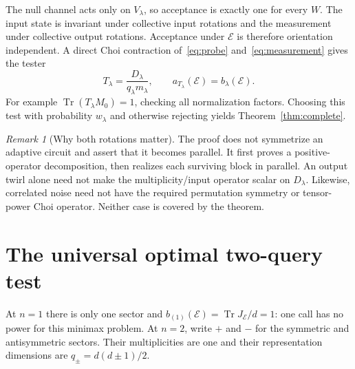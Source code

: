 \documentclass[11pt,a4paper]{article}
\theoremstyle{remark}\newtheorem{remark}[theorem]{Remark}
\DeclareMathOperator{\Tr}{Tr}
\newcommand{\cE}{\mathcal E}
\begin{document}
The null channel acts only on $V_\lambda$, so acceptance is exactly one for every $W$. The input state is invariant under collective input rotations and the measurement under collective output rotations. Acceptance under $\cE$ is therefore orientation independent. A direct Choi contraction of~\eqref{eq:probe} and~\eqref{eq:measurement} gives the tester
\begin{equation}\label{eq:Tlambda}
 T_\lambda=\frac{D_\lambda}{q_\lambda m_\lambda},
 \qquad a_{T_\lambda}(\cE)=b_\lambda(\cE).
\end{equation}
For example $\Tr(T_\lambda M_0)=1$, checking all normalization factors. Choosing this test with probability $w_\lambda$ and otherwise rejecting yields Theorem~\ref{thm:complete}.

\begin{remark}[Why both rotations matter]
The proof does not symmetrize an adaptive circuit and assert that it becomes parallel. It first proves a positive-operator decomposition, then realizes each surviving block in parallel. An output twirl alone need not make the multiplicity/input operator scalar on $D_\lambda$. Likewise, correlated noise need not have the required permutation symmetry or tensor-power Choi operator. Neither case is covered by the theorem.
\end{remark}

\section{The universal optimal two-query test}
At $n=1$ there is only one sector and $b_{(1)}(\cE)=\Tr J_{\cE}/d=1$: one call has no power for this minimax problem. At $n=2$, write $+$ and $-$ for the symmetric and antisymmetric sectors. Their multiplicities are one and their representation dimensions are $q_\pm=d(d\pm1)/2$.
\end{document}
